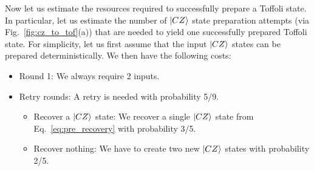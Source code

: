 Now let us estimate the resources required to successfully prepare a Toffoli state. In particular, let us estimate the number of $\ket{CZ}$ state preparation attempts (via Fig.~\ref{fig:cz_to_tof}(a)) that are needed to yield one successfully prepared Toffoli state. For simplicity, let us first assume that the input $\ket{CZ}$ states can be prepared deterministically. We then have the following costs:
\begin{itemize}
    \item Round 1: We always require 2 inputs.
    \item Retry rounds: A retry is needed with probability 5/9.
    \begin{itemize}
        \item Recover a $\ket{CZ}$ state: We recover a single $\ket{CZ}$ state from  Eq.~\eqref{eq:pre_recovery} with probability 3/5.
        \item Recover nothing: We have to create two new $\ket{CZ}$ states with probability 2/5.
    \end{itemize}
\end{itemize}

